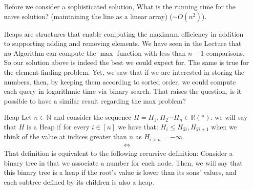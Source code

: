 Before we consider a sophisticated solution, What is the running time for the naive solution? (maintaining the line as a linear array) ($\sim O\left( n^2 \right)$).

Heaps are structures that enable computing the maximum efficiency in addition to supporting adding and removing elements.
We have seen in the Lecture that no Algorithm can compute the $\max$ function with less than $n-1$ comparisons. So our solution above is indeed the best we could expect for. The same is true for the element-finding problem. Yet, we saw that if we are interested in storing the numbers, then, by keeping them according to sorted order, we could compute each query in logarithmic time via binary search. That raises the question, is it possible to have a similar result regarding the max problem?

\begin{defbox}{Heap}
  Let $n \in \mathbb{N}$ and consider the sequence $H = H_{1}, H_{2} \cdots H_{n} \in \mathbb{R} \left( * \right)$. we will say that $H$ is a Heap if for every $i \in [n]$ we have that: $H_{i} \le H_{2i}, H_{2i + 1}$ when we think of the value at indices greater than $n$ as $H_{i>n} = -\infty$. 
  \begin{equation*}
    \begin{split}
      \Leftrightarrow
    \end{split}
  \end{equation*}
  That definition is equivalent to the following recursive definition: Consider a binary tree in that we associate a number for each node. Then, we will say that this binary tree is a heap if the root's value is lower than its sons' values, and each subtree defined by its children is also a heap. 
\end{defbox}



